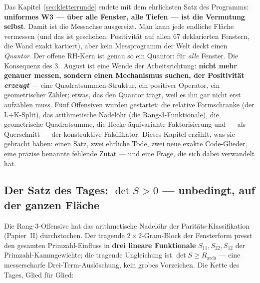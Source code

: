 \documentclass[11pt,a4paper]{article}
\begin{document}
Das Kapitel~\ref{sec:kletterrunde} endete mit dem ehrlichsten Satz
des Programms: \textbf{uniformes W3 --- über alle Fenster, alle
Tiefen --- ist die Vermutung selbst}. Damit ist die Messachse
ausgereizt. Man kann jede endliche Fläche vermessen (und das ist
geschehen: Positivität auf allen 67 deklarierten Fenstern, die Wand
exakt kartiert), aber kein Messprogramm der Welt deckt einen
\emph{Quantor}. Der offene RH-Kern ist genau so ein Quantor:
\glqq{}für \emph{alle} Fenster\grqq{}. Die Konsequenz des 3.~August
ist eine Wende der Arbeitsrichtung: \textbf{nicht mehr genauer
messen, sondern einen Mechanismus suchen, der Positivität
\emph{erzeugt}} --- eine Quadratsummen-Struktur, ein positiver
Operator, ein geometrischer Zähler; etwas, das den Quantor trägt,
weil es ihn gar nicht erst aufzählen muss. Fünf Offensiven wurden
gestartet: die relative Formschranke (der L$+$K-Split), das
arithmetische Nadelöhr (die Rang-3-Funktionale), die geometrische
Quadratsumme, die Hecke-äquivariante Faktorisierung und --- als
Querschnitt --- der konstruktive Falsifikator. Dieses Kapitel
erzählt, was sie gebracht haben: einen Satz, zwei ehrliche Tode,
zwei neue exakte Code-Glieder, eine präzise benannte fehlende Zutat
--- und eine Frage, die sich dabei verwandelt hat.

\subsection*{Der Satz des Tages: $\det S > 0$ --- unbedingt, auf der
ganzen Fläche}

Die Rang-3-Offensive hat das arithmetische Nadelöhr der
Paritäts-Klassifikation (Papier~II) durchstochen. Der tragende
$2 \times 2$-Gram-Block der Fensterform presst den gesamten
Primzahl-Einfluss in \textbf{drei lineare Funktionale} $S_{11},
S_{22}, S_{12}$ der Primzahl-Kammgewichte; die tragende Ungleichung
ist $\det S \ge R_{\mathrm{arch}}$ --- eine messerscharfe
Drei-Term-Auslöschung, kein grobes Vorzeichen. Die Kette des Tages,
Glied für Glied:
\end{document}
